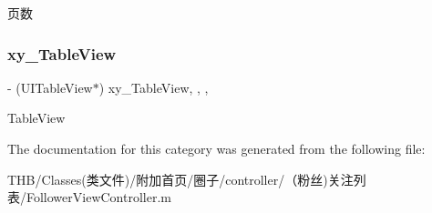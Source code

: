 页数 \mbox{\label{category_follower_view_controller_07_08_aaecb7796272a1092e3bda67c8bd6ddcd}} 
\subsubsection{\texorpdfstring{xy\+\_\+\+Table\+View}{xy\_TableView}}
{\footnotesize\ttfamily -\/ (U\+I\+Table\+View$\ast$) xy\+\_\+\+Table\+View\hspace{0.3cm}{\ttfamily [read]}, {\ttfamily [write]}, {\ttfamily [nonatomic]}, {\ttfamily [strong]}}

Table\+View 

The documentation for this category was generated from the following file\+:\begin{DoxyCompactItemize}
\item 
T\+H\+B/\+Classes(类文件)/附加首页/圈子/controller/（粉丝)关注列表/Follower\+View\+Controller.\+m\end{DoxyCompactItemize}
